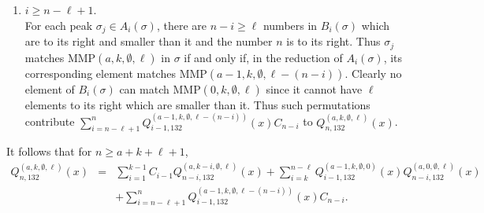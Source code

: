 \documentclass[
final,nomarks
]{dmtcs-episciences}
\newcommand{\Qmmn}[2]{Q_{#2,132}^{(#1)}(x)}
\newcommand{\MMP}{\mathrm{MMP}}
\begin{document}
\begin{enumerate}[{\bf Case }\bf 1.]
	\item \begin{math}i\geq n-\ell+1\end{math}. \\
	For each peak \begin{math}\sigma_j \in A_i(\sigma)\end{math},   
	there are \begin{math}n-i\geq \ell\end{math} numbers in \begin{math}B_i(\sigma)\end{math} which are to its right and smaller than it and 
	the number \begin{math}n\end{math} is to its right. 
	Thus \begin{math}\sigma_j\end{math} matches \begin{math}\MMP(a,k,\emptyset,\ell)\end{math} in \begin{math}\sigma\end{math} if and only if, 
	in the reduction of \begin{math}A_i(\sigma)\end{math}, its corresponding element matches 
	\begin{math}\MMP(a-1,k,\emptyset,\ell-(n-i))\end{math}. Clearly no element of \begin{math}B_i(\sigma) \end{math} can match \begin{math}\MMP(0,k,\emptyset,\ell)\end{math} since 
	it cannot have \begin{math}\ell\end{math} elements to its right which are smaller than it. 
	Thus such 
	permutations contribute \begin{math}\sum_{i=n-\ell+1}^{n} \Qmmn{a-1,k,\emptyset,\ell-(n-i)}{i-1} C_{n-i}\end{math} to 
	\begin{math}\Qmmn{a,k,\emptyset,\ell}{n}\end{math}. 
	
\end{enumerate}

It follows that for \begin{math}n \geq a+k+\ell+1\end{math},
\begin{eqnarray}
	\Qmmn{a,k,\emptyset,\ell}{n}&=&\sum_{i=1}^{k-1}C_{i-1}\Qmmn{a,k-i,\emptyset,\ell}{n-i}+\sum_{i=k}^{n-\ell}\Qmmn{a-1,k,\emptyset,0}{i-1}\Qmmn{a,0,\emptyset,\ell}{n-i}\nonumber\\
	&&+\sum_{i=n-\ell+1}^{n} \Qmmn{a-1,k,\emptyset,\ell-(n-i)}{i-1} C_{n-i}.
\end{eqnarray}
\end{document}
